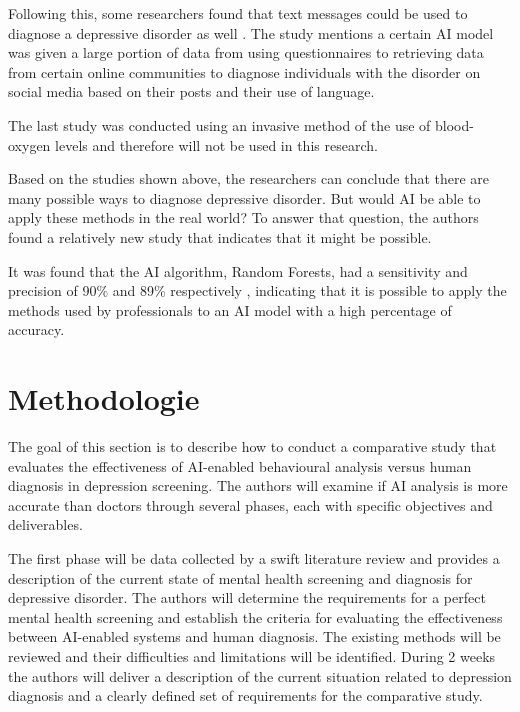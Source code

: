 \documentclass[dutch]{hogent-article}
\begin{document}
Following this, some researchers found that text messages could be used to diagnose a depressive disorder as well \autocite{Ahmed2022}. The study mentions a certain AI model was given a large portion of data from using questionnaires to retrieving data from certain online communities to diagnose individuals with the disorder on social media based on their posts and their use of language.

The last study was conducted using an invasive method of the use of blood-oxygen levels and therefore will not be used in this research. \autocite{Lu2012}

Based on the studies shown above, the researchers can conclude that there are many possible ways to diagnose depressive disorder. But would AI be able to apply these methods in the real world? To answer that question, the authors found a relatively new study that indicates that it might be possible.

It was found that the AI algorithm, Random Forests, had a sensitivity and precision of 90\% and 89\% respectively \autocite{SouzaFilho2021}, indicating that it is possible to apply the methods used by professionals to an AI model with a high percentage of accuracy.


\section{Methodologie}%
\label{sec:methodology}


The goal of this section is to describe how to conduct a comparative study that evaluates the effectiveness of AI-enabled behavioural analysis versus human diagnosis in depression screening. The authors will examine if AI analysis is more accurate than doctors through several phases, each with specific objectives and deliverables.

The first phase will be data collected by a swift literature review and provides a description of the current state of mental health screening and diagnosis for depressive disorder. The authors will determine the requirements for a perfect mental health screening and establish the criteria for evaluating the effectiveness between AI-enabled systems and human diagnosis. The existing methods will be reviewed and their difficulties and limitations will be identified. During 2 weeks the authors will deliver a description of the current situation related to depression diagnosis and a clearly defined set of requirements for the comparative study.
\end{document}
